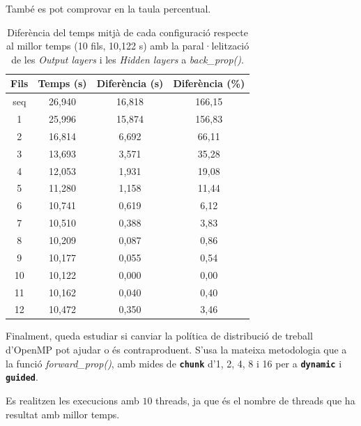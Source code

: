 \documentclass{article}
\begin{document}
També es pot comprovar en la taula percentual.
\begin{table}[H]
\centering
\begin{tabular}{|c|c|c|c|}
\hline
\textbf{Fils} & \textbf{Temps (s)} & \textbf{Diferència (s)} & \textbf{Diferència (\%)} \\ \hline
seq & 26,940 & 16,818 & 166,15 \\ \hline
1 & 25,996 & 15,874 & 156,83 \\ \hline
2 & 16,814 & 6,692 & 66,11 \\ \hline
3 & 13,693 & 3,571 & 35,28 \\ \hline
4 & 12,053 & 1,931 & 19,08 \\ \hline
5 & 11,280 & 1,158 & 11,44 \\ \hline
6 & 10,741 & 0,619 & 6,12 \\ \hline
7 & 10,510 & 0,388 & 3,83 \\ \hline
8 & 10,209 & 0,087 & 0,86 \\ \hline
9 & 10,177 & 0,055 & 0,54 \\ \hline
10 & 10,122 & 0,000 & 0,00 \\ \hline
11 & 10,162 & 0,040 & 0,40 \\ \hline
12 & 10,472 & 0,350 & 3,46 \\ \hline
\end{tabular}
\caption{Diferència del temps mitjà de cada configuració respecte al millor temps (10 fils, 10,122 s) amb la paral·lelització de les \textit{Output layers} i les \textit{Hidden layers} a \textit{back\_prop()}.}
\label{tab:dif_millor_bp_hid}
\end{table}

Finalment, queda estudiar si canviar la política de distribució de treball d'OpenMP pot ajudar o és contraproduent. S'usa la mateixa metodologia que a la funció \textit{forward\_prop()}, amb mides de \textbf{\texttt{chunk}} d'1, 2, 4, 8 i 16 per a \textbf{\texttt{dynamic}} i \textbf{\texttt{guided}}.

Es realitzen les execucions amb $10$ threads, ja que és el nombre de threads que ha resultat amb millor temps.
\end{document}
